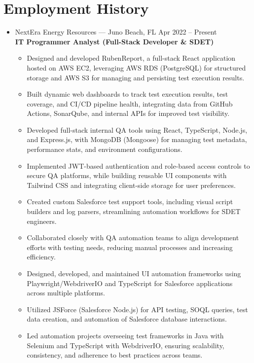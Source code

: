 \documentclass[letterpaper,10pt]{article}
\newcommand{\role}[2]{\textbf{#1}\hfill\textit{#2}}
\newcommand{\place}[2]{#1 \hfill #2}
\begin{document}
\section*{Employment History}
\begin{itemize}
    \item{
        \place{NextEra Energy Resources — Juno Beach, FL}{Apr 2022 – Present} \\
        \role{IT Programmer Analyst (Full-Stack Developer \& SDET)}{} \\
        \begin{itemize}
            \item{Designed and developed RubenReport, a full-stack React application hosted on AWS EC2, leveraging AWS RDS (PostgreSQL) for structured storage and AWS S3 for managing and persisting test execution results.}
            \item{Built dynamic web dashboards to track test execution results, test coverage, and CI/CD pipeline health, integrating data from GitHub Actions, SonarQube, and internal APIs for improved test visibility.}
            \item{Developed full-stack internal QA tools using React, TypeScript, Node.js, and Express.js, with MongoDB (Mongoose) for managing test metadata, performance stats, and environment configurations.}
            \item{Implemented JWT-based authentication and role-based access controls to secure QA platforms, while building reusable UI components with Tailwind CSS and integrating client-side storage for user preferences.}
            \item{Created custom Salesforce test support tools, including visual script builders and log parsers, streamlining automation workflows for SDET engineers.}
            \item{Collaborated closely with QA automation teams to align development efforts with testing needs, reducing manual processes and increasing efficiency.}
            \item{Designed, developed, and maintained UI automation frameworks using Playwright/WebdriverIO and TypeScript for Salesforce applications across multiple platforms.}
            \item{Utilized JSForce (Salesforce Node.js) for API testing, SOQL queries, test data creation, and automation of Salesforce database interactions.}
            \item{Led automation projects overseeing test frameworks in Java with Selenium and TypeScript with WebdriverIO, ensuring scalability, consistency, and adherence to best practices across teams.}

\end{itemize}}
\end{itemize}
\end{document}
